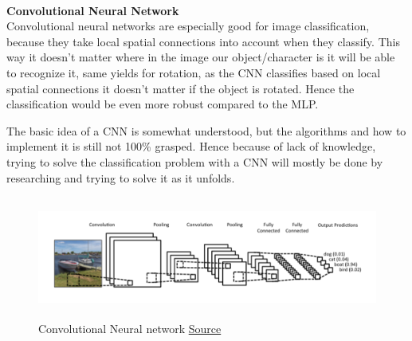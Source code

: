 \documentclass[11pt,a4paper,UKenglish]{article}
\begin{document}
\noindent \\ \textbf{Convolutional Neural Network}
\noindent \\ Convolutional neural networks are especially good for image
classification, because they take local spatial connections into account when
they classify. This way it doesn't matter where in the image our
object/character is it will be able to recognize it, same yields for rotation,
as the CNN classifies based on local spatial connections it doesn't matter if
the object is rotated. Hence the classification would be even more robust
compared to the MLP. \par
The basic idea of a CNN is somewhat understood, but the algorithms and how to
implement it is still not 100\% grasped. Hence because of lack of knowledge,
trying to solve the classification problem with a CNN will mostly be done
by researching and trying to solve it as it unfolds.

\begin{figure}[H]
  \centering
  \includegraphics[height=4cm]{res/CNN_architecture.png}
  \caption{Convolutional Neural network \href{ http://www.wildml.com/2015/11/understanding-convolutional-neural-networks-for-nlp/}{Source}}
  \label{fig:CNN_architecture}
\end{figure}
\end{document}

